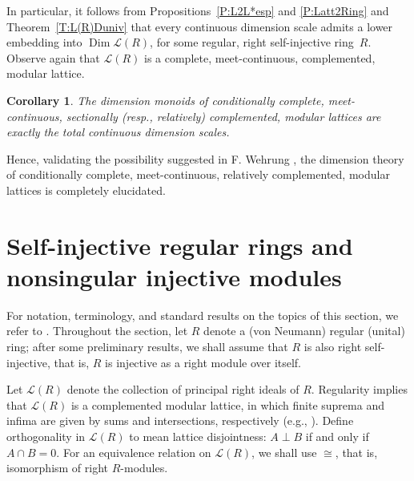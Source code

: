 \documentclass[psamsfonts,reqno]{memo-l}
\theoremstyle{plain}
\newtheorem{corollary}[lemma]{Corollary}
\theoremstyle{definition}
\theoremstyle{remark}
\numberwithin{equation}{section}
\newcommand{\pup}[1]{\textup{(}{#1}\textup{)}}
\DeclareMathOperator{\Dim}{Dim}
\newcommand{\Lat}{\mathcal{L}}
\begin{document}
In particular, it
follows from Propositions~\ref{P:L2L*esp} and \ref{P:Latt2Ring} and
Theorem~\ref{T:L(R)Duniv} that every continuous dimension scale admits a lower embedding into
\index{dzzimL@$\Dim L$} $\Dim\Lat(R)$, for some regular, right self-injective
ring~$R$.
%
Observe again that $\Lat(R)$ is a complete, meet-continuous,
complemented, modular
 lattice.

\begin{corollary}\label{C:DimSCML}
The dimension monoids of conditionally complete,
meet-continuous, sectionally \pup{resp., relatively} complemented, modular
lattices
 are
exactly the total continuous dimension scales.
\end{corollary}

Hence, validating the possibility suggested in F.
Wehrung \cite{CGApp}, the dimension theory of
conditionally complete, meet-continuous, relatively complemented, modular
lattices is completely elucidated.


\section[Self-injective regular rings]{Self-injective regular rings and
nonsingular injective modules}
\label{S:RSIReg}

For notation, terminology, and standard results on the topics of
this section, we refer to \cite{GoBo, Gnonsing, GvnRR}.
%
Throughout the section, let
$R$ denote a (von Neumann) regular (unital) ring; after some preliminary results, we shall assume that $R$ is
also right self-injective, that is, $R$ is injective as a right module over
itself.

Let $\Lat(R)$ denote the collection of principal right
ideals of $R$. Regularity implies that $\Lat(R)$ is a complemented
modular
lattice, in which finite suprema and infima are given by
sums and intersections, respectively (e.g., \cite[Theorem~2.3]{GvnRR}).
Define orthogonality in $\Lat(R)$ to mean lattice disjointness: $A\perp B$
if and only if $A\cap B=0$. For an equivalence relation on $\Lat(R)$, we
shall use $\cong$, that is, isomorphism of right $R$-modules.
\end{document}
